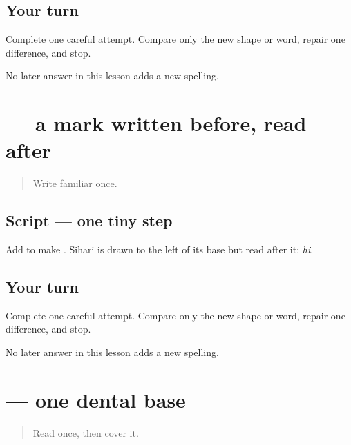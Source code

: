 \subsection*{Your turn}
Complete one careful attempt. Compare only the new shape or word, repair one difference, and stop.

\begin{tcolorbox}[breakable,colback=teal!4,colframe=teal!35!black,title={Before you move on}]
No later answer in this lesson adds a new spelling.
\end{tcolorbox}
\section[\texorpdfstring{\pa{ਿ} (sihari)}{ਿ (sihari)}]{ — a mark written before, read after}

\label{lesson:PA-W03-sihari}



\begin{quote}
Write familiar \textbf{} once.
\end{quote}

\subsection*{Script — one tiny step}
Add \textbf{} to make \textbf{}. Sihari is drawn to the left of its base but read after it: \emph{hi}.

\subsection*{Your turn}
Complete one careful attempt. Compare only the new shape or word, repair one difference, and stop.

\begin{tcolorbox}[breakable,colback=teal!4,colframe=teal!35!black,title={Before you move on}]
No later answer in this lesson adds a new spelling.
\end{tcolorbox}
\section[\texorpdfstring{\pa{ਦ} (da)}{ਦ (da)}]{ — one dental base}

\label{lesson:PA-W03-da}



\begin{quote}
Read \textbf{} once, then cover it.
\end{quote}

